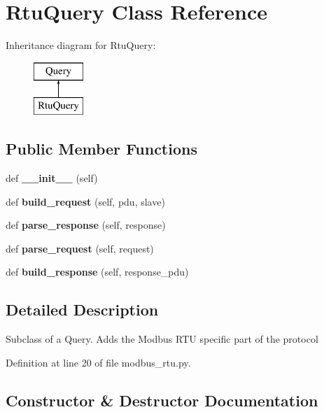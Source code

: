 \section{Rtu\+Query Class Reference}
\label{classprotolibs_1_1modbus__tk_1_1modbus__rtu_1_1_rtu_query}
Inheritance diagram for Rtu\+Query\+:\begin{figure}[H]
\begin{center}
\leavevmode
\includegraphics[height=2.000000cm]{classprotolibs_1_1modbus__tk_1_1modbus__rtu_1_1_rtu_query}
\end{center}
\end{figure}
\subsection*{Public Member Functions}
\begin{DoxyCompactItemize}
\item 
def {\bf \+\_\+\+\_\+init\+\_\+\+\_\+} (self)
\item 
def {\bf build\+\_\+request} (self, pdu, slave)
\item 
def {\bf parse\+\_\+response} (self, response)
\item 
def {\bf parse\+\_\+request} (self, request)
\item 
def {\bf build\+\_\+response} (self, response\+\_\+pdu)
\end{DoxyCompactItemize}


\subsection{Detailed Description}
\begin{DoxyVerb}Subclass of a Query. Adds the Modbus RTU specific part of the protocol\end{DoxyVerb}
 

Definition at line 20 of file modbus\+\_\+rtu.\+py.



\subsection{Constructor \& Destructor Documentation}
